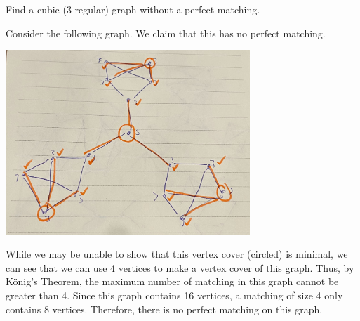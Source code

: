 \question Find a cubic (3-regular) graph without a perfect matching.

\begin{solution}
  Consider the following graph. We claim that this has no perfect matching. 

  \begin{center}
    \includegraphics[width=0.69\textwidth]{figures/p2-soln}
  \end{center}

  While we may be unable to show that this vertex cover (circled) is minimal, we
  can see that we can use 4 vertices to make a vertex cover of this graph. Thus,
  by K\"onig's Theorem, the maximum number of matching in this graph cannot be
  greater than 4. Since this graph contains 16 vertices, a matching of size 4
  only contains 8 vertices. Therefore, there is no perfect matching on this graph.
\end{solution}
